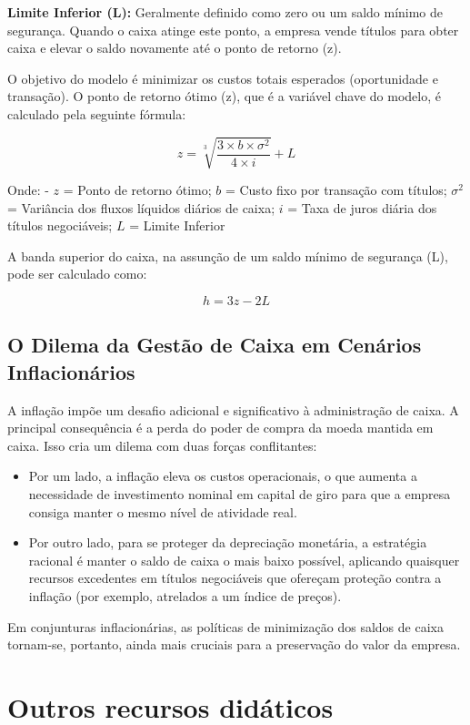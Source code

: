 \documentclass[
  a4paper,
]{book}
\begin{document}
\textbf{Limite Inferior (L):} Geralmente definido como zero ou um saldo
mínimo de segurança. Quando o caixa atinge este ponto, a empresa vende
títulos para obter caixa e elevar o saldo novamente até o ponto de
retorno (z).

O objetivo do modelo é minimizar os custos totais esperados
(oportunidade e transação). O ponto de retorno ótimo (z), que é a
variável chave do modelo, é calculado pela seguinte fórmula:

\[z = \sqrt[3]{\frac{3 \times b \times \sigma^2}{4 \times i}} + L\]

Onde: - \(z\) = Ponto de retorno ótimo; \(b\) = Custo fixo por transação
com títulos; \(\sigma^2\) = Variância dos fluxos líquidos diários de
caixa; \(i\) = Taxa de juros diária dos títulos negociáveis; \(L\) =
Limite Inferior

A banda superior do caixa, na assunção de um saldo mínimo de segurança
(L), pode ser calculado como:

\[h = 3z - 2L\]

\subsection{O Dilema da Gestão de Caixa em Cenários
Inflacionários}\label{o-dilema-da-gestuxe3o-de-caixa-em-cenuxe1rios-inflacionuxe1rios}

A inflação impõe um desafio adicional e significativo à administração de
caixa. A principal consequência é a perda do poder de compra da moeda
mantida em caixa. Isso cria um dilema com duas forças conflitantes:

\begin{itemize}
\item
  Por um lado, a inflação eleva os custos operacionais, o que aumenta a
  necessidade de investimento nominal em capital de giro para que a
  empresa consiga manter o mesmo nível de atividade real.
\item
  Por outro lado, para se proteger da depreciação monetária, a
  estratégia racional é manter o saldo de caixa o mais baixo possível,
  aplicando quaisquer recursos excedentes em títulos negociáveis que
  ofereçam proteção contra a inflação (por exemplo, atrelados a um
  índice de preços).
\end{itemize}

Em conjunturas inflacionárias, as políticas de minimização dos saldos de
caixa tornam-se, portanto, ainda mais cruciais para a preservação do
valor da empresa.

\section*{Outros recursos
didáticos}\label{outros-recursos-diduxe1ticos-1}
\end{document}
